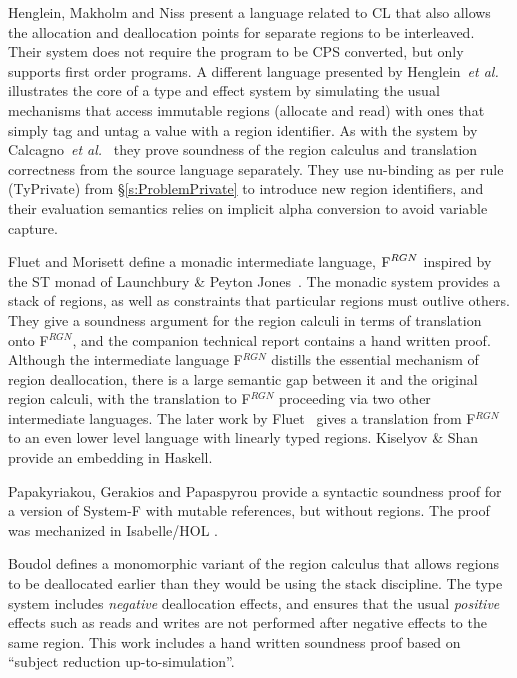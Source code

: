 Henglein, Makholm and Niss  present a language related to CL that also allows the allocation and deallocation points for separate regions to be interleaved. Their system does not require the program to be CPS converted, but only supports first order programs. A different language presented by Henglein~\emph{et al.}  illustrates the core of a type and effect system by simulating the usual mechanisms that access immutable regions (allocate and read) with ones that simply tag and untag a value with a region identifier. As with the system by Calcagno~\emph{et al.}~ they prove soundness of the region calculus and translation correctness from the source language separately. They use nu-binding \cite{Pitts:new} as per rule (TyPrivate) from \S\ref{s:ProblemPrivate} to introduce new region identifiers, and their evaluation semantics relies on implicit alpha conversion to avoid variable capture.


Fluet and Morisett  define a monadic intermediate language, $\textrm{F}^{RGN}$ inspired by the ST monad of Launchbury \& Peyton Jones~. The monadic system provides a stack of regions, as well as constraints that particular regions must outlive others. They give a soundness argument for the region calculi in terms of translation onto F$^{RGN}$, and the companion technical report \cite{Fluet:monadic-regions-techreport} contains a hand written proof. Although the intermediate language F$^{RGN}$ distills the essential mechanism of region deallocation, there is a large semantic gap between it and the original region calculi, with the translation to F$^{RGN}$ proceeding via two other intermediate languages. The later work by Fluet~ gives a translation from F$^{RGN}$ to an even lower level language with linearly typed regions. Kiselyov \& Shan  provide an embedding in Haskell.

Papakyriakou, Gerakios and Papaspyrou  provide a syntactic soundness proof for a version of System-F with mutable references, but without regions. The proof was mechanized in Isabelle/HOL \cite{Nipkow:Isabelle}.


Boudol  defines a monomorphic variant of the region calculus that allows regions to be deallocated earlier than they would be using the stack discipline. The type system includes \emph{negative} deallocation effects, and ensures that the usual \emph{positive} effects such as reads and writes are not performed after negative effects to the same region. This work includes a hand written soundness proof based on ``subject reduction up-to-simulation''.


